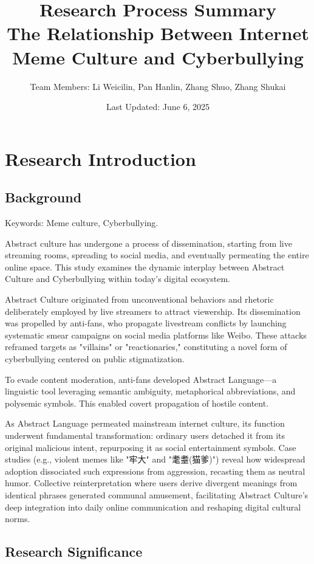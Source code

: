 \documentclass[12pt,a4paper]{ctexart}
\title{
    {\Large Research Process Summary}\\
    {\large The Relationship Between Internet Meme Culture and Cyberbullying}
}
\author{
    {\small Team Members: Li Weicilin, Pan Hanlin, Zhang Shuo, Zhang Shukai}\\
}
\date{Last Updated: June 6, 2025}
\theoremstyle{MyLineTheoremStyle}
\theoremstyle{MyBlockTheoremStyle}
\theoremstyle{MySubsubsectionStyle}
\begin{document}
\maketitle
\tableofcontents
\newpage

\section{Research Introduction}
\subsection{Background}

Keywords: Meme culture, Cyberbullying.

Abstract culture has undergone a process of dissemination, starting from live streaming rooms, spreading to social media, and eventually permeating the entire online space. This study examines the dynamic interplay between Abstract Culture and Cyberbullying within today's digital ecosystem.

Abstract Culture originated from unconventional behaviors and rhetoric deliberately employed by live streamers to attract viewership. Its dissemination was propelled by anti-fans, who propagate livestream conflicts by launching systematic smear campaigns on social media platforms like Weibo. These attacks reframed targets as "villains" or "reactionaries," constituting a novel form of cyberbullying centered on public stigmatization.

To evade content moderation, anti-fans developed Abstract Language—a linguistic tool leveraging semantic ambiguity, metaphorical abbreviations, and polysemic symbols. This enabled covert propagation of hostile content.

As Abstract Language permeated mainstream internet culture, its function underwent fundamental transformation: ordinary users detached it from its original malicious intent, repurposing it as social entertainment symbols. Case studies (e.g., violent memes like "牢大" and "耄耋(猫爹)") reveal how widespread adoption dissociated such expressions from aggression, recasting them as neutral humor. Collective reinterpretation where users derive divergent meanings from identical phrases generated communal amusement, facilitating Abstract Culture's deep integration into daily online communication and reshaping digital cultural norms.

\subsection{Research Significance}
\end{document}

